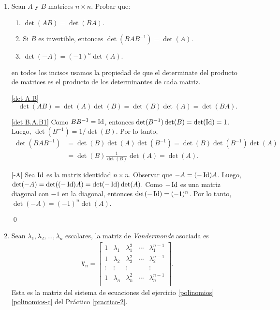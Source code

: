 \begin{enumerate}[topsep=6pt,itemsep=.4cm]
    \item Sean $A$ y  $B$ matrices $n \times n$. Probar que:
    \begin{enumerate}
        \item\label{det A.B} $\det(AB) = \det (BA)$.
        \item\label{det B.A.B1} Si $B$ es invertible, entonces $\det(B A B^{-1}) = \det (A)$.
        \item\label{-A} $\det(-A) = (-1)^n\det (A)$.
    \end{enumerate} 
    \rta en todos los incisos usamos la propiedad de que el determinate del producto de matrices es el producto de los determinantes de cada matriz.


    \ref{det A.B} 
    $$
    \det(AB) = \det(A)\det(B) = \det(B)\det(A) = \det(BA).
    $$

    \ref{det B.A.B1} Como $BB^{-1} = \operatorname{Id}$, entonces $\det(B^{-1})\det(B) = \det(\operatorname{Id}) = 1$. Luego, $\det(B^{-1}) = 1/\det(B)$. Por lo tanto,
    \begin{align*}
        \det(B A B^{-1}) &= \det(B)\det(A)\det(B^{-1}) = \det(B)\det(B^{-1})\det(A)\\ &=  \det(B)\frac1{\det(B)}\det(A)=\det(A).
    \end{align*}
    

    \ref{-A} Sea $\operatorname{Id}$ es la matriz identidad $n \times n$. Observar que $-A = (-\operatorname{Id})A$. Luego, $\det(-A) = \det((-\operatorname{Id})A) = \det(-\operatorname{Id})\det(A)$. Como $-\operatorname{Id}$ es una matriz diagonal con $-1$ en la diagonal, entonces $\det(-\operatorname{Id}) = (-1)^n$. Por lo tanto, $\det(-A) = (-1)^n\det(A)$.

    \qed
    
    \item\label{vandermonde} Sean $\lambda_1, \lambda_2, \dots, \lambda_n$ escalares, la matriz de \emph{Vandermonde} asociada es
    \begin{align*}
    \mathtt V_n = \begin{bmatrix}
    1 & \lambda_1 & \lambda_1^2 & \cdots & \lambda_1^{n-1}\\
    1 & \lambda_2 & \lambda_2^2 & \cdots & \lambda_2^{n-1}\\
    \vdots &\vdots &\vdots & &\vdots\\
    1 & \lambda_n & \lambda_n^2 & \cdots & \lambda_n^{n-1}\\
    \end{bmatrix}.
    \end{align*}
    Esta es la matriz del sistema de ecuaciones del ejercicio \ref{polinomios}\,\ref{polinomios-c} del Práctico \ref{practico-2}.
    

\end{enumerate}
